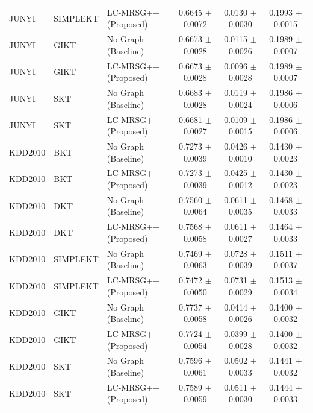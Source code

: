 \begin{table}[htbp]
\begin{tabular}{lllccc}
JUNYI & SIMPLEKT & LC-MRSG++ (Proposed) & 0.6645 $\pm$ 0.0072 & 0.0130 $\pm$ 0.0030 & 0.1993 $\pm$ 0.0015 \\
JUNYI & GIKT & No Graph (Baseline) & 0.6673 $\pm$ 0.0028 & 0.0115 $\pm$ 0.0026 & 0.1989 $\pm$ 0.0007 \\
JUNYI & GIKT & LC-MRSG++ (Proposed) & 0.6673 $\pm$ 0.0028 & 0.0096 $\pm$ 0.0028 & 0.1989 $\pm$ 0.0007 \\
JUNYI & SKT & No Graph (Baseline) & 0.6683 $\pm$ 0.0028 & 0.0119 $\pm$ 0.0024 & 0.1986 $\pm$ 0.0006 \\
JUNYI & SKT & LC-MRSG++ (Proposed) & 0.6681 $\pm$ 0.0027 & 0.0109 $\pm$ 0.0015 & 0.1986 $\pm$ 0.0006 \\
\hline
KDD2010 & BKT & No Graph (Baseline) & 0.7273 $\pm$ 0.0039 & 0.0426 $\pm$ 0.0010 & 0.1430 $\pm$ 0.0023 \\
KDD2010 & BKT & LC-MRSG++ (Proposed) & 0.7273 $\pm$ 0.0039 & 0.0425 $\pm$ 0.0012 & 0.1430 $\pm$ 0.0023 \\
KDD2010 & DKT & No Graph (Baseline) & 0.7560 $\pm$ 0.0064 & 0.0611 $\pm$ 0.0035 & 0.1468 $\pm$ 0.0033 \\
KDD2010 & DKT & LC-MRSG++ (Proposed) & 0.7568 $\pm$ 0.0058 & 0.0611 $\pm$ 0.0027 & 0.1464 $\pm$ 0.0033 \\
KDD2010 & SIMPLEKT & No Graph (Baseline) & 0.7469 $\pm$ 0.0063 & 0.0728 $\pm$ 0.0039 & 0.1511 $\pm$ 0.0037 \\
KDD2010 & SIMPLEKT & LC-MRSG++ (Proposed) & 0.7472 $\pm$ 0.0050 & 0.0731 $\pm$ 0.0029 & 0.1513 $\pm$ 0.0034 \\
KDD2010 & GIKT & No Graph (Baseline) & 0.7737 $\pm$ 0.0058 & 0.0414 $\pm$ 0.0026 & 0.1400 $\pm$ 0.0032 \\
KDD2010 & GIKT & LC-MRSG++ (Proposed) & 0.7724 $\pm$ 0.0054 & 0.0399 $\pm$ 0.0028 & 0.1400 $\pm$ 0.0032 \\
KDD2010 & SKT & No Graph (Baseline) & 0.7596 $\pm$ 0.0061 & 0.0502 $\pm$ 0.0033 & 0.1441 $\pm$ 0.0032 \\
KDD2010 & SKT & LC-MRSG++ (Proposed) & 0.7589 $\pm$ 0.0059 & 0.0511 $\pm$ 0.0030 & 0.1444 $\pm$ 0.0033 \\
\hline
\end{tabular}
\end{table}